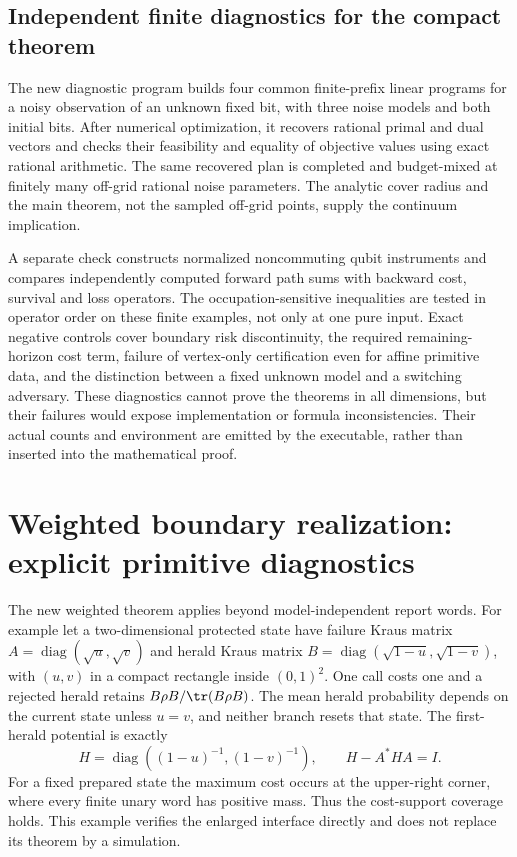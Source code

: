 \subsection{Independent finite diagnostics for the compact theorem}
The new diagnostic program builds four common finite-prefix linear programs for a noisy observation of an unknown fixed bit, with three noise models and both initial bits. After numerical optimization, it recovers rational primal and dual vectors and checks their feasibility and equality of objective values using exact rational arithmetic. The same recovered plan is completed and budget-mixed at finitely many off-grid rational noise parameters. The analytic cover radius and the main theorem, not the sampled off-grid points, supply the continuum implication.

A separate check constructs normalized noncommuting qubit instruments and compares independently computed forward path sums with backward cost, survival and loss operators. The occupation-sensitive inequalities are tested in operator order on these finite examples, not only at one pure input. Exact negative controls cover boundary risk discontinuity, the required remaining-horizon cost term, failure of vertex-only certification even for affine primitive data, and the distinction between a fixed unknown model and a switching adversary. These diagnostics cannot prove the theorems in all dimensions, but their failures would expose implementation or formula inconsistencies. Their actual counts and environment are emitted by the executable, rather than inserted into the mathematical proof.




\section{Weighted boundary realization: explicit primitive diagnostics}\label{sec:supp-weighted}
The new weighted theorem applies beyond model-independent report words. For example let a two-dimensional protected state have failure Kraus matrix
$A=\operatorname{diag}(\sqrt{u},\sqrt{v})$ and herald Kraus matrix
$B=\operatorname{diag}(\sqrt{1-u},\sqrt{1-v})$, with $(u,v)$ in a compact rectangle inside $(0,1)^2$. One call costs one and a rejected herald retains $B\rho B/\tr(B\rho B)$. The mean herald probability depends on the current state unless $u=v$, and neither branch resets that state. The first-herald potential is exactly
\[
 H=\operatorname{diag}((1-u)^{-1},(1-v)^{-1}),\qquad H-A^*HA=I.
\]
For a fixed prepared state the maximum cost occurs at the upper-right corner, where every finite unary word has positive mass. Thus the cost-support coverage holds. This example verifies the enlarged interface directly and does not replace its theorem by a simulation.

